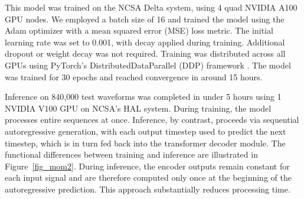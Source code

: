 \documentclass[12pt]{iopart}
\begin{document}
This model was trained on the NCSA Delta system, using 4 quad NVIDIA A100 GPU nodes. We employed a batch size of 16 and trained the model using the Adam optimizer \cite{kingma2014adam} with a mean squared error (MSE) loss metric. The initial learning rate was set to 0.001, with decay applied during training. Additional dropout or weight decay was not required. Training was distributed across all GPUs using PyTorch's DistributedDataParallel (DDP) framework \cite{2019arXiv191201703P}. The model was trained for 30 epochs and reached convergence in around 15 hours. 

Inference on 840,000 test waveforms was completed in under 5 hours using 1 NVIDIA V100 GPU on NCSA's HAL system. During training, the model processes entire sequences at once. Inference, by contrast, proceeds via sequential autoregressive generation, with each output timestep used to predict the next timestep, which is in turn fed back into the transformer decoder module. The functional differences between training and inference are illustrated in Figure~\ref{fig_mom2}. During inference, the encoder outputs remain constant for each input signal and are therefore computed only once at the beginning of the autoregressive prediction. This approach substantially reduces processing time.
\end{document}
